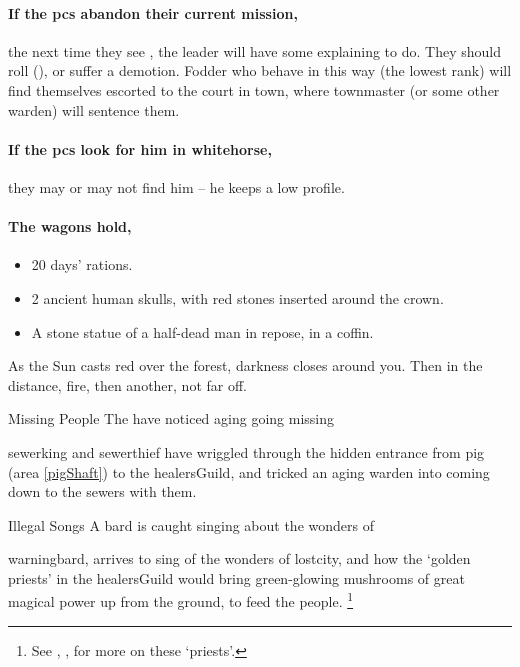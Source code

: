 \paragraph{If the \glspl{pc} abandon their current mission,}
the next time they see , the leader will have some explaining to do.
They should roll  (\tn[12]), or suffer a demotion.
Fodder who behave in this way (the lowest rank) will find themselves escorted to the \gls{court} in \gls{town}, where \gls{townmaster} (or some other \gls{warden}) will sentence them.%

\paragraph{If the \glspl{pc} look for him in \gls{whitehorse},}
they may or may not find him -- he keeps a low profile.

\paragraph{The wagons hold,}

\begin{itemize}
  \item
  20 days' rations.
  \item
  2 ancient human skulls, with red stones inserted around the crown.
  \label{skullCrown}
  \item
  A stone statue of a half-dead man in repose, in a coffin.
\end{itemize}

\begin{boxtext}
  As the Sun casts red over the forest, darkness closes around you.
  Then in the distance, fire, then another, not far off.
\end{boxtext}

  {Missing People}%
  {The  have noticed aging  going missing}%

\Gls{sewerking} and \gls{sewerthief} have wriggled through the hidden entrance from \gls{pig} (area \vref{pigShaft}) to the \gls{healersGuild}, and tricked an aging \gls{warden} into coming down to the sewers with them.

{Illegal Songs}%
{A bard is caught singing about the wonders of }%

\Gls{warningbard}, arrives to sing of the wonders of \gls{lostcity}, and how the `golden priests' in the \gls{healersGuild} would bring green-glowing mushrooms of great magical power up from the ground, to feed the people.%
\footnote{See , , for more on these `priests'.}

